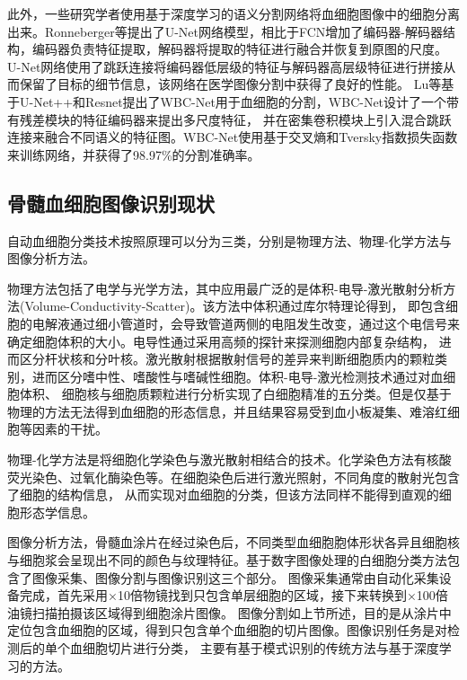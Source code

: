 此外，一些研究学者使用基于深度学习的语义分割网络将血细胞图像中的细胞分离出来。Ronneberger\cite{long2015fully}等提出了U-Net网络模型，相比于FCN增加了编码器-解码器结构，编码器负责特征提取，解码器将提取的特征进行融合并恢复到原图的尺度。
U-Net网络使用了跳跃连接将编码器低层级的特征与解码器高层级特征进行拼接从而保留了目标的细节信息，该网络在医学图像分割中获得了良好的性能。
Lu等\cite{lu2021wbc}基于U-Net++和Resnet提出了WBC-Net用于血细胞的分割，WBC-Net设计了一个带有残差模块的特征编码器来提出多尺度特征，
并在密集卷积模块上引入混合跳跃连接来融合不同语义的特征图。WBC-Net使用基于交叉熵和Tversky指数损失函数来训练网络，并获得了98.97\%的分割准确率。
\subsection{骨髓血细胞图像识别现状}
自动血细胞分类技术按照原理可以分为三类，分别是物理方法、物理-化学方法与图像分析方法\cite{wubai2011}。

物理方法包括了电学与光学方法，其中应用最广泛的是体积-电导-激光散射分析方法(Volume-Conductivity-Scatter)。该方法中体积通过库尔特理论得到，
即包含细胞的电解液通过细小管道时，会导致管道两侧的电阻发生改变，通过这个电信号来确定细胞体积的大小。电导性通过采用高频的探针来探测细胞内部复杂结构，
进而区分杆状核和分叶核。激光散射根据散射信号的差异来判断细胞质内的颗粒类别，进而区分嗜中性、嗜酸性与嗜碱性细胞。体积-电导-激光检测技术通过对血细胞体积、
细胞核与细胞质颗粒进行分析实现了白细胞精准的五分类。但是仅基于物理的方法无法得到血细胞的形态信息，并且结果容易受到血小板凝集、难溶红细胞等因素的干扰。

物理-化学方法是将细胞化学染色与激光散射相结合的技术。化学染色方法有核酸荧光染色、过氧化酶染色等。在细胞染色后进行激光照射，不同角度的散射光包含了细胞的结构信息，
从而实现对血细胞的分类，但该方法同样不能得到直观的细胞形态学信息。

图像分析方法，骨髓血涂片在经过染色后，不同类型血细胞胞体形状各异且细胞核与细胞浆会呈现出不同的颜色与纹理特征。基于数字图像处理的白细胞分类方法包含了图像采集、图像分割与图像识别这三个部分。
图像采集通常由自动化采集设备完成，首先采用×10倍物镜找到只包含单层细胞的区域，接下来转换到×100倍油镜扫描拍摄该区域得到细胞涂片图像。
图像分割如上节所述，目的是从涂片中定位包含血细胞的区域，得到只包含单个血细胞的切片图像。图像识别任务是对检测后的单个血细胞切片进行分类，
主要有基于模式识别的传统方法与基于深度学习的方法。

